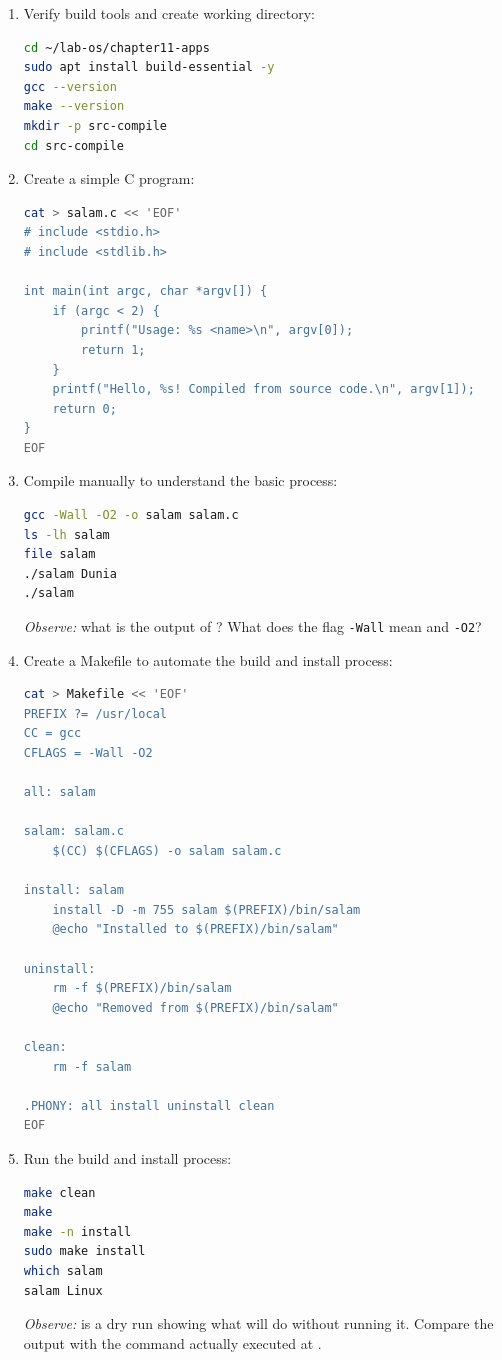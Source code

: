 \begin{enumerate}
\item Verify build tools and create working directory:
\begin{lstlisting}[language=bash, caption={Preparation of compilation environment}]
cd ~/lab-os/chapter11-apps
sudo apt install build-essential -y
gcc --version
make --version
mkdir -p src-compile
cd src-compile
\end{lstlisting}

\item Create a simple C program:
\begin{lstlisting}[language=bash, caption={Creating C Program Source Code}]
cat > salam.c << 'EOF'
# include <stdio.h>
# include <stdlib.h>

int main(int argc, char *argv[]) {
    if (argc < 2) {
        printf("Usage: %s <name>\n", argv[0]);
        return 1;
    }
    printf("Hello, %s! Compiled from source code.\n", argv[1]);
    return 0;
}
EOF
\end{lstlisting}

\item Compile manually to understand the basic process:
\begin{lstlisting}[language=bash, caption={Manual compilation with gcc}]
gcc -Wall -O2 -o salam salam.c
ls -lh salam
file salam
./salam Dunia
./salam
\end{lstlisting}
\textit{Observe:} what is the output of ? What does the flag \texttt{-Wall} mean
and \texttt{-O2}?

\item Create a Makefile to automate the build and install process:
\begin{lstlisting}[language=bash, caption={Create a Makefile with install and uninstall targets}]
cat > Makefile << 'EOF'
PREFIX ?= /usr/local
CC = gcc
CFLAGS = -Wall -O2

all: salam

salam: salam.c
	$(CC) $(CFLAGS) -o salam salam.c

install: salam
	install -D -m 755 salam $(PREFIX)/bin/salam
	@echo "Installed to $(PREFIX)/bin/salam"

uninstall:
	rm -f $(PREFIX)/bin/salam
	@echo "Removed from $(PREFIX)/bin/salam"

clean:
	rm -f salam

.PHONY: all install uninstall clean
EOF
\end{lstlisting}

\item Run the build and install process:
\begin{lstlisting}[language=bash, caption={Build and install with Makefile}]
make clean
make
make -n install
sudo make install
which salam
salam Linux
\end{lstlisting}
\textit{Observe:}  is a dry run showing what
will do without running it. Compare the output with the command actually executed at .


\end{enumerate}

